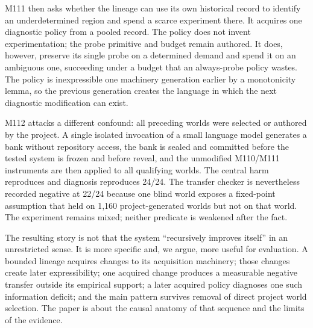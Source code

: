 M111 then asks whether the lineage can use its own historical record to identify an underdetermined region and spend a scarce experiment there. It acquires one diagnostic policy from a pooled record. The policy does not invent experimentation; the probe primitive and budget remain authored. It does, however, preserve its single probe on a determined demand and spend it on an ambiguous one, succeeding under a budget that an always-probe policy wastes. The policy is inexpressible one machinery generation earlier by a monotonicity lemma, so the previous generation creates the language in which the next diagnostic modification can exist.

M112 attacks a different confound: all preceding worlds were selected or authored by the project. A single isolated invocation of a small language model generates a bank without repository access, the bank is sealed and committed before the tested system is frozen and before reveal, and the unmodified M110/M111 instruments are then applied to all qualifying worlds. The central harm reproduces and diagnosis reproduces 24/24. The transfer checker is nevertheless recorded negative at 22/24 because one blind world exposes a fixed-point assumption that held on 1,160 project-generated worlds but not on that world. The experiment remains mixed; neither predicate is weakened after the fact.

The resulting story is not that the system ``recursively improves itself'' in an unrestricted sense. It is more specific and, we argue, more useful for evaluation. A bounded lineage acquires changes to its acquisition machinery; those changes create later expressibility; one acquired change produces a measurable negative transfer outside its empirical support; a later acquired policy diagnoses one such information deficit; and the main pattern survives removal of direct project world selection. The paper is about the causal anatomy of that sequence and the limits of the evidence.

